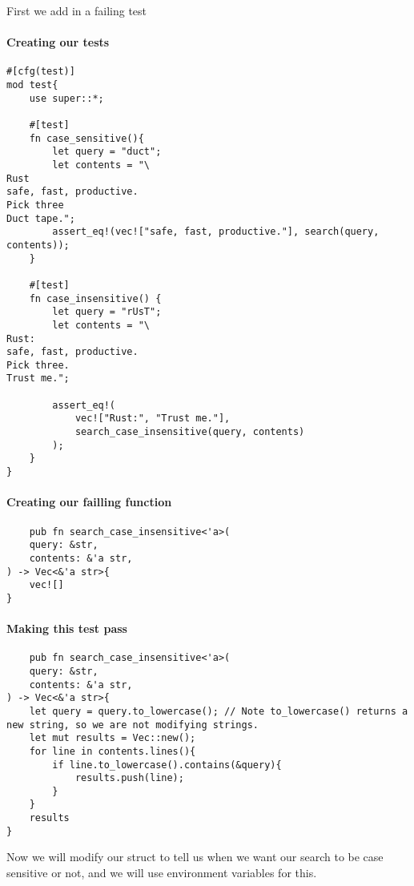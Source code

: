 First we add in a failing test
\paragraph*{Creating our tests}\begin{lstlisting}
#[cfg(test)]
mod test{
    use super::*;

    #[test]
    fn case_sensitive(){
        let query = "duct";
        let contents = "\
Rust
safe, fast, productive.
Pick three
Duct tape.";
        assert_eq!(vec!["safe, fast, productive."], search(query, contents));
    }

    #[test]
    fn case_insensitive() {
        let query = "rUsT";
        let contents = "\
Rust:
safe, fast, productive.
Pick three.
Trust me.";

        assert_eq!(
            vec!["Rust:", "Trust me."],
            search_case_insensitive(query, contents)
        );
    }
}
\end{lstlisting}
\paragraph*{Creating our failling function}\begin{lstlisting}
    pub fn search_case_insensitive<'a>(
    query: &str,
    contents: &'a str,
) -> Vec<&'a str>{
    vec![]
}
\end{lstlisting}
\paragraph*{Making this test pass}\begin{lstlisting}
    pub fn search_case_insensitive<'a>(
    query: &str,
    contents: &'a str, 
) -> Vec<&'a str>{
    let query = query.to_lowercase(); // Note to_lowercase() returns a new string, so we are not modifying strings.
    let mut results = Vec::new();
    for line in contents.lines(){
        if line.to_lowercase().contains(&query){
            results.push(line);  
        }
    }
    results
}
\end{lstlisting}

Now we will modify our struct to tell us when we want our search to be case sensitive or not, and we will use environment variables for this.

